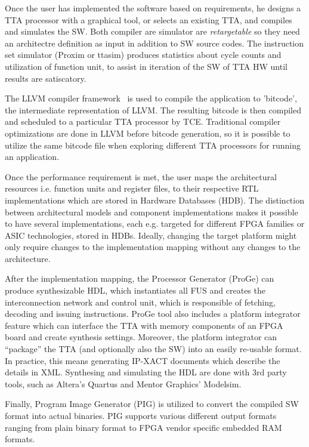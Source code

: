 \documentclass[twoside]{tceusermanual}
\begin{document}
Once the user has implemented the software based on requirements, he
designs a TTA processor with a graphical tool, or selects an existing
TTA, and compiles and simulates the SW. Both compiler are simulator are
\textit{retargetable} so they need an architectre definition as 
input in addition to SW source codes. The instruction set simulator (Proxim
or ttasim) produces statistics about cycle counts and utilization of function 
unit, to assist in iteration of the SW of TTA HW until results are satiscatory.

The LLVM compiler framework~\cite{llvm-home-page} is used to compile
the application to 'bitcode', the intermediate representation of
LLVM. The resulting bitcode is then compiled and scheduled to a
particular TTA processor by TCE. Traditional compiler optimizations
are done in LLVM before bitcode generation, so it is possible to
utilize the same bitcode file when exploring different TTA processors
for running an application.

Once the performance requirement is met, the user maps the
architectural resources i.e. function units and register files, to
their respective RTL implementations which are stored in Hardware
Databases (HDB). The distinction between architectural models and
component implementations makes it possible to have several
implementations, each e.g. targeted for different FPGA families or
ASIC technologies, stored in HDBs. Ideally, changing the target
platform might only require changes to the implementation mapping
without any changes to the architecture.

After the implementation mapping, the Processor Generator (ProGe) can
produce synthesizable HDL, which instantiates all FUS and creates the
interconnection network and control unit, which is responsible of
fetching, decoding and issuing instructions. ProGe tool also includes
a platform integrator feature which can interface the TTA with memory
components of an FPGA board and create synthesis settings. Moreover,
the platform integrator can ``package'' the TTA (and optionally also the
SW) into an easily re-usable format. In practice, this means generating
IP-XACT documents which describe the details in XML. Synthesing and
simulating the HDL are done with 3rd party tools, such as Altera's
Quartus and Mentor Graphics' Modelsim.

Finally, Program Image Generator (PIG) is utilized to convert the 
compiled SW format into actual binaries. PIG supports various
different output formats ranging from plain binary format to FPGA
vendor specific embedded RAM formats.
\end{document}
